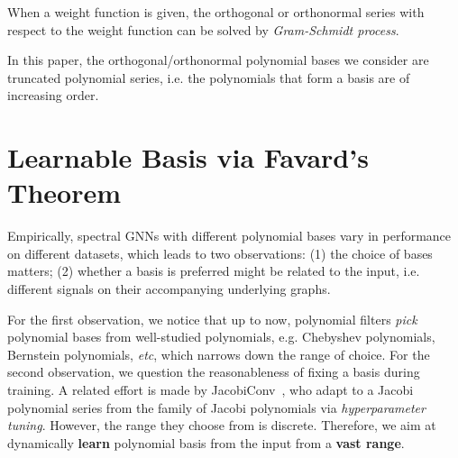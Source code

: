 When a weight function is given, the orthogonal or orthonormal series 
with respect to the weight function 
can be solved by \textit{Gram-Schmidt process}.

\begin{remark}
\label{remark:increasing_order}
In this paper, the orthogonal/orthonormal polynomial bases we consider 
are truncated polynomial series, i.e. the polynomials that form a basis are of 
increasing order. 
\end{remark}





%
 























 \section{Learnable Basis via Favard's Theorem}
\label{sec:methodI}






Empirically,
spectral GNNs with different polynomial bases vary in performance on different datasets, which leads to two observations: (1) the choice of bases matters; (2) whether a basis is preferred might be related to the input, i.e. 
different signals on their accompanying underlying graphs.

For the first observation, we notice that up to now, polynomial filters \textit{pick} polynomial bases 
from well-studied polynomials, e.g. Chebyshev polynomials, Bernstein polynomials, \textit{etc}, 
which narrows down the range of choice.  
For the second observation, we question the reasonableness of fixing a basis during training. 
A related effort is made by JacobiConv~\cite{wang2019improving}, 
who adapt to a Jacobi polynomial series from the family of Jacobi polynomials via \textit{hyperparameter tuning}. However, 
the range they choose from is discrete. 
Therefore, we aim at dynamically \textbf{learn} polynomial basis from the input from a \textbf{vast range}. 














